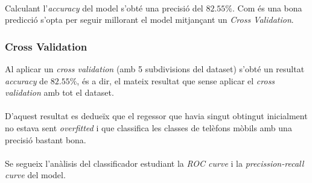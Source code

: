 \documentclass[a4paper, 11pt]{article}
\begin{document}
\\
Calculant l'\textit{accuracy} del model s'obté una precisió del $82.55\%$. Com és una bona predicció s'opta per seguir millorant el model mitjançant un \textit{Cross Validation}.

\subsubsection{Cross Validation}
Al aplicar un \textit{cross validation} (amb 5 subdivisions del dataset) s'obté un resultat \textit{accuracy} de $ 82.55\%$, és a dir, el mateix resultat que sense aplicar el \textit{cross validation} amb tot el dataset. \\\\ 
D'aquest resultat es dedueïx que el regessor que havia singut obtingut inicialment no estava sent \textit{overfitted} i que classifica les classes de telèfons mòbils amb una precisió bastant bona.\\\\
Se segueix l'anàlisis del classificador estudiant la \textit{ROC curve} i la \textit{precission-recall curve} del model.
\newpage
\end{document}
